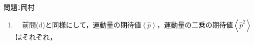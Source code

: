 \documentclass[fleqn]{jbook}
\begin{document}
\begin{answer}{問題1}{岡村}
\begin{enumerate}
\begin{enumerate}
    \begin{eqnarray}
\left\langle {\hat x} \right\rangle &=& \left\langle {\alpha ^ *  \left| {\hat x} \right|\alpha } \right\rangle / \left\langle {\alpha ^ *}|{\alpha} \right\rangle = \left\langle {\alpha ^ *  \left| {\sqrt {\frac{\hbar }{{2m\omega }}} \left( {a^{\dagger}  + a} \right)} \right|\alpha } \right\rangle  / \left\langle {\alpha ^ *}|{\alpha} \right\rangle \cr
 & & \cr
 &=& \sqrt {\frac{\hbar }{{2m\omega }}} \left( {\alpha ^ *   + \alpha } \right) ,\\
  & & \cr
  \left\langle {\hat x^2} \right\rangle &=& \left\langle {\alpha ^ *  \left| {\hat x^2 } \right|\alpha } \right\rangle  / \left\langle {\alpha ^ *}|{\alpha} \right\rangle  = \left\langle {\alpha ^ *  \left| {\frac{\hbar }{{2m\omega }}\left( {a^{\dagger}  + a} \right)^2 } \right|\alpha } \right\rangle  / \left\langle {\alpha ^ *}|{\alpha} \right\rangle  \cr 
  & & \cr
   &=& \frac{\hbar }{{2m\omega }}\left\langle {\alpha ^ *  \left| {\left\{ {\left( {a^{\dagger} } \right)^2  + a^{\dagger} a + \left( {1 + a^{\dagger} a} \right) + a^2 } \right\}} \right|\alpha } \right\rangle  / \left\langle {\alpha ^ *}|{\alpha} \right\rangle  \cr 
   & & \cr
   &=& \frac{\hbar }{{2m\omega }}\left[ {\left( {\alpha ^ *  } \right)^2  + 2\left| \alpha  \right|^2  + \alpha ^2  + 1} \right] \cr
   & & \cr
   &=& \frac{\hbar }{{2m\omega }}\left[ {\left( {\alpha ^ *   + \alpha } \right)^2  + 1} \right] \\\nonumber
 \end{eqnarray}
 
 と計算される。$(20)$の計算途中で交換関係$(4)$を使った。これらより座標の不確定さ${\Delta x}$の二乗は
 
 \begin{eqnarray}
 \left( {\Delta x} \right)^2  &=& \left\langle {\left( {\hat x - \left\langle {\hat x} \right\rangle } \right)^2 } \right\rangle = \left\langle {\hat x^2 } \right\rangle  - \left\langle {\hat x} \right\rangle ^2 \cr
 & & \cr
 &=& \frac{\hbar }{{2m\omega }}\left[ {\left( {\alpha ^ *   + \alpha } \right)^2  + 1} \right] - \left[ \sqrt {\frac{\hbar }{{2m\omega }}} \left( {\alpha ^ *   + \alpha } \right) \right]^2 \cr
 & & \cr
 &=&\frac{\hbar }{{2m\omega }} 
 \end{eqnarray}
 と求められる。\\
 
    \item 　前問(d)と同様にして，運動量の期待値$\left\langle {\hat p} \right\rangle$，運動量の二乗の期待値$\left\langle {\hat p^2} \right\rangle$はそれぞれ，
    

\end{enumerate}
\end{enumerate}
\end{answer}
\end{document}
